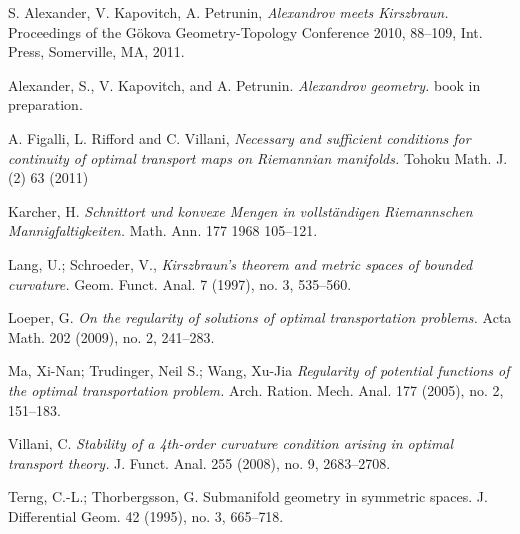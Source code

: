 \documentclass{article}
\begin{document}
\begin{thebibliography}{52}
 S. Alexander, V. Kapovitch, A. Petrunin, 
\emph{Alexandrov meets Kirszbraun.} 
Proceedings of the Gökova Geometry-Topology Conference 2010, 88--109, Int. Press, Somerville, MA, 2011.

 Alexander, S., V. Kapovitch, and A. Petrunin. \emph{Alexandrov geometry.} book in preparation.

A. Figalli, L. Rifford and C. Villani,
\emph{Necessary and sufficient conditions for continuity of optimal transport maps on Riemannian manifolds.} Tohoku Math. J. (2) 63 (2011)

Karcher, H.
\emph{Schnittort und konvexe Mengen in vollständigen Riemannschen Mannigfaltigkeiten.}
Math. Ann. 177 1968 105--121.

 Lang, U.; Schroeder, V.,
\emph{Kirszbraun's theorem and metric spaces of bounded curvature.}
Geom. Funct. Anal. 7 (1997), no. 3, 535–560. 

Loeper, G.
\emph{On the regularity of solutions of optimal transportation problems.}
Acta Math. 202 (2009), no. 2, 241–283. 

 Ma, Xi-Nan; Trudinger, Neil S.; Wang, Xu-Jia
\emph{Regularity of potential functions of the optimal transportation problem.}
Arch. Ration. Mech. Anal. 177 (2005), no. 2, 151--183. 

 Villani, C. \emph{Stability of a 4th-order curvature condition arising in optimal transport theory.}
J. Funct. Anal. 255 (2008), no. 9, 2683--2708.


 Terng, C.-L.; Thorbergsson, G. Submanifold geometry in symmetric spaces. J. Differential Geom. 42 (1995), no. 3, 665--718.
 
\end{thebibliography}
\end{document}
